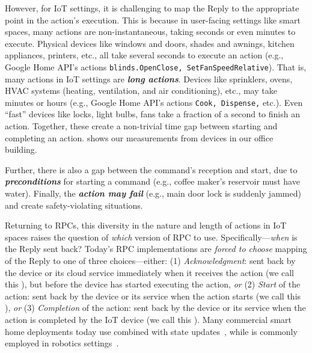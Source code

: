 However, for IoT settings, it is challenging to map the Reply to the appropriate point in the action's execution. 
This is because in user-facing settings like smart spaces, many actions are non-instantaneous, taking seconds or even minutes to execute. 
Physical devices like windows and doors, shades and awnings, kitchen appliances, printers, etc., all 
take several seconds to execute an action (e.g., Google Home API's actions {\tt blinds.OpenClose, SetFanSpeedRelative}). That is, many actions in IoT settings are \textbf{\textit{long actions}}.
Devices like sprinklers, ovens, HVAC systems (heating, ventilation, and air conditioning), etc., may take minutes or hours (e.g., Google Home API's actions {\tt Cook, Dispense,} etc.). Even ``fast'' devices like locks, light bulbs, fans
take a fraction of a second to finish an action. Together, these create a 
non-trivial time gap between starting and completing an action. 
 shows our measurements from devices in our office building. 

Further, there is also a gap between the command's reception and start, due to
\textbf{\textit{preconditions}} for starting a command (e.g., coffee maker's reservoir 
{must have} water). Finally, the \textbf{\textit{action may fail}} (e.g., main door lock is suddenly jammed) and create safety-violating situations. 

Returning to RPCs, 
this diversity in the nature and length of actions in IoT spaces raises the question of {\it which} version of RPC to use. Specifically---{\it when} is the Reply sent back? 
Today's RPC implementations are {\it forced to choose}  mapping of the Reply to one of three choices---either: (1) {\it Acknowledgment}: sent back by the device or its
{cloud} service immediately when it receives the action (we call this {\it \RPCa}), but before the device has started executing the action, {\it or} (2) {\it Start} of the action: sent back by the device or its service when the action starts (we call this {\it \RPCs}), {\it or} (3) {\it Completion} of the action: sent back by the device or its service when the action is completed by the IoT device (we call this {\it \RPCc}). Many commercial smart home deployments today use  \RPCa{} combined with state updates~\cite{Alexa, GoogleHome}, while \RPCc{} is commonly employed in robotics settings~\cite{RECOVER_Cornelio, Zhang_2019_CVPR}. 

